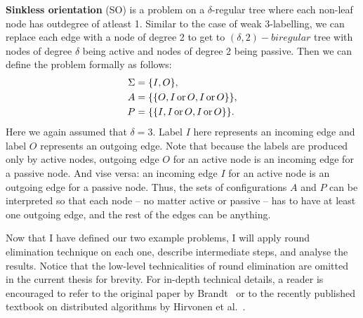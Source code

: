 \textbf{Sinkless orientation} (SO) is a problem on a $\delta$-regular tree
where each non-leaf node has outdegree of atleast 1. Similar to the case of weak 3-labelling,
we can replace each edge with a node of degree 2 to get to $(\delta, 2)-biregular$ tree with
nodes of degree $\delta$ being active and nodes of degree 2 being passive.
Then we can define the problem formally as follows:
\begin{align*}
\Sigma &= \{I, O\}, \\
A &= \{ \{O, I \operatorname{or} O, I \operatorname{or} O\} \}, \\
P &= \{ \{I, I \operatorname{or} O, I \operatorname{or} O\}\}.
\end{align*}
Here we again assumed that $\delta = 3$. Label $I$ here represents
an incoming edge and label $O$ represents an outgoing edge.
Note that because the labels are produced only by active nodes,
outgoing edge $O$ for an active node is an incoming edge for a 
passive node. And vise versa: an incoming edge $I$ for an active node
is an outgoing edge for a passive node. Thus, the sets of configurations
$A$ and $P$ can be interpreted so that each node -- no matter active or passive --
has to have at least one outgoing edge, and the rest of the edges can be anything.

Now that I have defined our two example problems,
I will apply round elimination
technique on each one, describe intermediate steps, and analyse the results.
Notice that the low-level technicalities of round elimination
are omitted in the current thesis for brevity. For in-depth technical details, a reader is encouraged
to refer to the original paper by Brandt~\cite{Brandt2019} or to the recently published textbook on distributed algorithms
by Hirvonen et al.~\cite{Hirvonen2020}.


